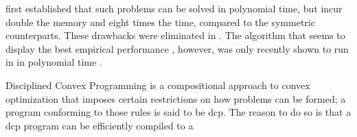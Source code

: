 \textcite*{nesterov1996infeasible} first established that such problems can be solved in polynomial time, but incur double the memory and eight times the time, compared to the symmetric counterparts. These drawbacks were eliminated in \cite{skajaa2015homogeneous}.
The algorithm that seems to display the best empirical performance \parencite{dahl2022primal}, however, was only recently shown to
run in
in polynomial time \parencite{badenbroek2021algorithm}.

Disciplined Convex Programming \parencite{dcp-thesis} is a
compositional approach to convex 
optimization that imposes
certain 
restrictions on how problems can be formed;
a program 
conforming to
those rules is said to be dcp.
The reason to do so is that a dcp program can be efficiently compiled to a
